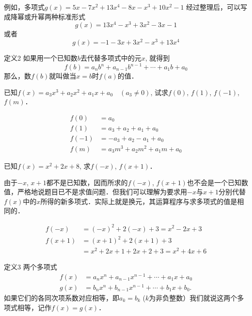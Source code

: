 例如，多项式$g (x) =5x-7x^2+13x^4-8x-x^3+10x^2-1$
经过整理后，可以写成降幂或升幂两种标准形式
\[g (x) =13x^4-x^3+3x^2-3x-1\]
或者
\[g (x) =-1-3x+3x^2-x^3+13x^4\]

\begin{blk}{定义2}
如果用一个已知数$b$去代替多项式中的元$x$, 就得到 
\[f(b)=a_nb^n+a_{n-1}b^{n-1}+\cdots+a_1b +a_0\]
那么，数$f(b)$就叫做当$x=b$时$f(a)$的值．
\end{blk}

\begin{example}
    已知$f(x)=a_3x^3+a_2x^2+a_1x+a_0\quad (a_3\ne 0)$, 试求$f (0)$, $f (1)$, $f (-1)$, $f (m)$． 
\end{example}


\begin{solution}
\[\begin{split}
    f (0) &=a_0\\
    f (1) &=a_3+a_2+a_1+a_0\\
    f (-1) &= -a_3+a_2-a_1+a_0\\
    f (m) &=a_3m^3+a_2m^2+a_1m+a_0
\end{split}\]
\end{solution}

\begin{example}
    已知$f(x)=x^2+2x+8$, 求$f(-x)$, $f(x+1)$．
\end{example}

\begin{analyze}
    由于$-x$, $x+1$都不是已知数，因而所求的$f(-x)$, $f(x+1)$也不会是一个已知数值，严格地说题目已不是求值问题．但我们可以理解为要求用$-x$与$x+1$分别代替$f(x)$中的$x$所得的新多项式．实际上就是换元，其运算程序与求多项式的值是相同的．
\end{analyze}

\begin{solution}
\[\begin{split}
    f(-x)&=(-x)^2+2(-x)+3=x^2-2x+3\\    
    f(x+1)&=(x+1)^2+2(x+1)+3\\
    &=x^2+2x+1+2x+2+3=x^2+4x+6
\end{split}\] 
\end{solution}

\begin{blk}{定义3}
    两个多项式
\[\begin{split}
f (x) &=a_nx^n+a_{n-1}x^{n-1}+\cdots +a_1x+a_0\\
g (x) &=b_nx^n+b_{n-1}x^{n-1}+\cdots+b_1x+b_0.    
\end{split}\]
如果它们的各同次项系数对应相等，即$a_k=b_k$ ($k$为非负整数）我们就说这两个多项式相等，记作$f(x)=g(x)$．
\end{blk}



